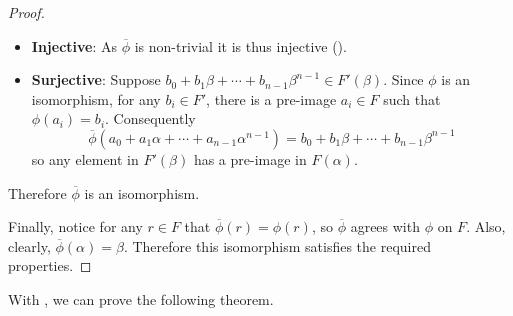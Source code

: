 \begin{proof}
\begin{itemize}
        \item \textbf{Injective}: As $\overline{\phi}$ is non-trivial it is thus injective ().

        \item \textbf{Surjective}: Suppose $b_0 + b_1\beta + \cdots + b_{n-1}\beta^{n-1} \in F'(\beta)$. Since $\phi$ is an isomorphism, for any $b_i \in F'$, there is a pre-image $a_i \in F$ such that $\phi(a_i) = b_i$. Consequently
        \[
            \overline{\phi}\left(a_0 + a_1\alpha + \cdots + a_{n-1}\alpha^{n-1}\right) = b_0 + b_1\beta + \cdots + b_{n-1}\beta^{n-1}
        \]
        so any element in $F'(\beta)$ has a pre-image in $F(\alpha)$.
    \end{itemize}
    Therefore $\overline{\phi}$ is an isomorphism.

    Finally, notice for any $r \in F$ that $\overline{\phi}(r) = \phi(r)$, so $\overline{\phi}$ agrees with $\phi$ on $F$. Also, clearly, $\overline{\phi}(\alpha) = \beta$. Therefore this isomorphism satisfies the required properties.
\end{proof}

With , we can prove the following theorem.

